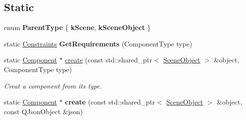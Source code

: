 \subsection*{Static}
\begin{DoxyCompactItemize}
\item 
\mbox{\label{classrev_1_1_component_a4ffbe1c1d9226c20a6da19261c529c6a}} 
enum {\bfseries Parent\+Type} \{ {\bfseries k\+Scene}, 
{\bfseries k\+Scene\+Object}
 \}
\item 
\mbox{\label{classrev_1_1_component_a54de5654f783c327972579c27fe42486}} 
static \mbox{\hyperlink{structrev_1_1_component_1_1_constraints}{Constraints}} {\bfseries Get\+Requirements} (Component\+Type type)
\item 
\mbox{\label{classrev_1_1_component_a3b86f3381524df05c84cd92b6159dda9}} 
static \mbox{\hyperlink{classrev_1_1_component}{Component}} $\ast$ \mbox{\hyperlink{classrev_1_1_component_a3b86f3381524df05c84cd92b6159dda9}{create}} (const std\+::shared\+\_\+ptr$<$ \mbox{\hyperlink{classrev_1_1_scene_object}{Scene\+Object}} $>$ \&object, Component\+Type type)
\begin{DoxyCompactList}\small\item\em Creat a component from its type. \end{DoxyCompactList}\item 
\mbox{\label{classrev_1_1_component_ab5da526f06d5f5a356602c4a973682d2}} 
static \mbox{\hyperlink{classrev_1_1_component}{Component}} $\ast$ {\bfseries create} (const std\+::shared\+\_\+ptr$<$ \mbox{\hyperlink{classrev_1_1_scene_object}{Scene\+Object}} $>$ \&object, const Q\+Json\+Object \&json)
\end{DoxyCompactItemize}
